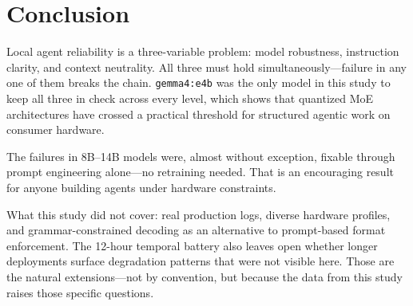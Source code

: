\documentclass{kdmile}
\begin{document}
\section{Conclusion}
\label{sec:conclusion}

Local agent reliability is a three-variable problem: model robustness,
instruction clarity, and context neutrality.
All three must hold simultaneously—failure in any one of them breaks the chain.
\texttt{gemma4:e4b} was the only model in this study to keep all three in check
across every level, which shows that quantized MoE architectures have crossed a
practical threshold for structured agentic work on consumer hardware.

The failures in 8B--14B models were, almost without exception, fixable through
prompt engineering alone—no retraining needed.
That is an encouraging result for anyone building agents under hardware constraints.

What this study did not cover: real production logs, diverse hardware profiles,
and grammar-constrained decoding as an alternative to prompt-based format
enforcement.
The 12-hour temporal battery also leaves open whether longer deployments surface
degradation patterns that were not visible here.
Those are the natural extensions—not by convention, but because the data from
this study raises those specific questions.



\end{document}
